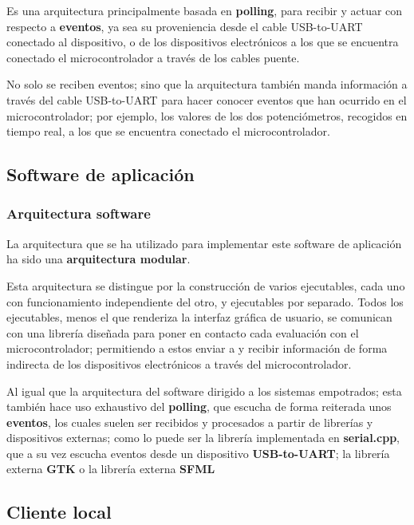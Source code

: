 \documentclass[12pt,a4paper,twoside,openright]{book}
\begin{document}
Es una arquitectura principalmente basada en \textbf{polling}, para recibir y actuar con respecto a \textbf{eventos}, ya sea su proveniencia desde el cable USB-to-UART conectado al dispositivo, o de los dispositivos electrónicos a los que se encuentra conectado el microcontrolador a través de los cables puente.

No solo se reciben eventos; sino que la arquitectura también manda información a través del cable USB-to-UART para hacer conocer eventos que han ocurrido en el microcontrolador; por ejemplo, los valores de los dos potenciómetros, recogidos en tiempo real, a los que se encuentra conectado el microcontrolador.

\subsection{Software de aplicación}

\subsubsection{Arquitectura software}

La arquitectura que se ha utilizado para implementar este software de aplicación ha sido una \textbf{arquitectura modular}.

Esta arquitectura se distingue por la construcción de varios ejecutables, cada uno con funcionamiento independiente del otro, y ejecutables por separado. Todos los ejecutables, menos el que renderiza la interfaz gráfica de usuario, se comunican con una librería diseñada para poner en contacto cada evaluación con el microcontrolador; permitiendo a estos enviar a y recibir información de forma indirecta de los dispositivos electrónicos a través del microcontrolador.

Al igual que la arquitectura del software dirigido a los sistemas empotrados; esta también hace uso exhaustivo del \textbf{polling}, que escucha de forma reiterada unos \textbf{eventos}, los cuales suelen ser recibidos y procesados a partir de librerías y dispositivos externas; como lo puede ser la librería implementada en \textbf{serial.cpp}, que a su vez escucha eventos desde un dispositivo \textbf{USB-to-UART}; la librería externa \textbf{GTK} o la librería externa \textbf{SFML}

\subsection{Cliente local}
\end{document}
